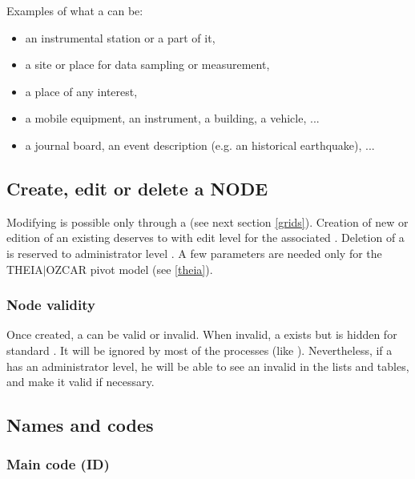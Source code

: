 Examples of what a  can be:
\begin{itemize}
\item    an instrumental station or a part of it,
\item    a site or place for data sampling or measurement,
\item    a place of any interest,
\item    a mobile equipment, an instrument, a building, a vehicle, ...
\item    a journal board, an event description (e.g. an historical earthquake), ...
\end{itemize}




\subsection{Create, edit or delete a NODE}

Modifying  is possible only through a  (see next section \ref{grids}). Creation of new  or edition of an existing  deserves to  with edit level for the associated . Deletion of a  is reserved to administrator level . A few parameters are needed only for the THEIA$\vert$OZCAR pivot model (see \ref{theia}).

\subsubsection{Node validity}

Once created, a  can be valid or invalid. When invalid, a  exists but is hidden for standard . It will be ignored by most of the \webobs processes (like ). Nevertheless, if a  has an administrator level, he will be able to see an invalid  in the lists and tables, and make it valid if necessary.


\subsection{Names and codes}

\subsubsection{Main code (ID)}

